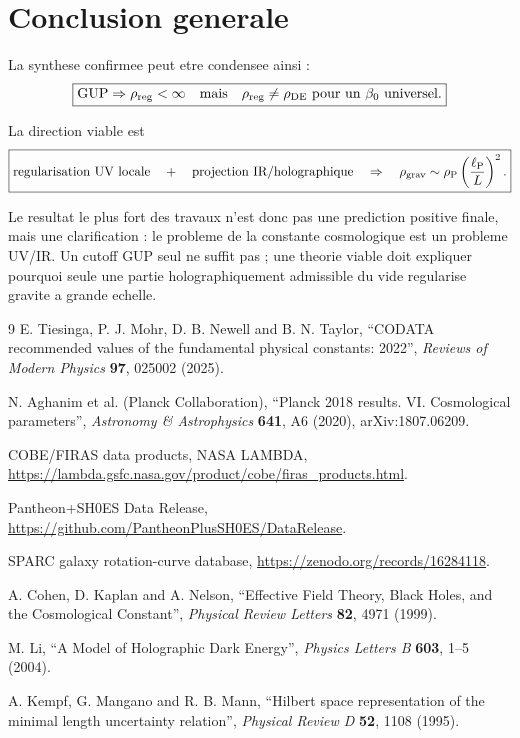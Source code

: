 \documentclass[11pt,a4paper]{article}
\newcommand{\lp}{\ell_{\rm P}}
\newcommand{\rhoP}{\rho_{\rm P}}
\newcommand{\rhoDE}{\rho_{\rm DE}}
\newcommand{\rhoReg}{\rho_{\rm reg}}
\begin{document}
\section{Conclusion generale}

La synthese confirmee peut etre condensee ainsi :
\begin{equation}
\boxed{
\text{GUP}
\Rightarrow
\rhoReg<\infty
\quad\text{mais}\quad
\rhoReg\neq\rhoDE
\text{ pour un }\beta_0\text{ universel.}
}
\end{equation}

La direction viable est
\begin{equation}
\boxed{
\text{regularisation UV locale}
\quad+\quad
\text{projection IR/holographique}
\quad\Rightarrow\quad
\rho_{\rm grav}\sim
\rhoP\left(\frac{\lp}{L}\right)^2.
}
\end{equation}

Le resultat le plus fort des travaux n'est donc pas une prediction positive
finale, mais une clarification : le probleme de la constante cosmologique est
un probleme UV/IR. Un cutoff GUP seul ne suffit pas ; une theorie viable doit
expliquer pourquoi seule une partie holographiquement admissible du vide
regularise gravite a grande echelle.

\begin{thebibliography}{9}
E. Tiesinga, P. J. Mohr, D. B. Newell and B. N. Taylor,
``CODATA recommended values of the fundamental physical constants: 2022'',
\emph{Reviews of Modern Physics} \textbf{97}, 025002 (2025).

N. Aghanim et al. (Planck Collaboration),
``Planck 2018 results. VI. Cosmological parameters'',
\emph{Astronomy \& Astrophysics} \textbf{641}, A6 (2020),
arXiv:1807.06209.

COBE/FIRAS data products, NASA LAMBDA,
\url{https://lambda.gsfc.nasa.gov/product/cobe/firas_products.html}.

Pantheon+SH0ES Data Release,
\url{https://github.com/PantheonPlusSH0ES/DataRelease}.

SPARC galaxy rotation-curve database,
\url{https://zenodo.org/records/16284118}.

A. Cohen, D. Kaplan and A. Nelson,
``Effective Field Theory, Black Holes, and the Cosmological Constant'',
\emph{Physical Review Letters} \textbf{82}, 4971 (1999).

M. Li,
``A Model of Holographic Dark Energy'',
\emph{Physics Letters B} \textbf{603}, 1--5 (2004).

A. Kempf, G. Mangano and R. B. Mann,
``Hilbert space representation of the minimal length uncertainty relation'',
\emph{Physical Review D} \textbf{52}, 1108 (1995).
\end{thebibliography}
\end{document}
